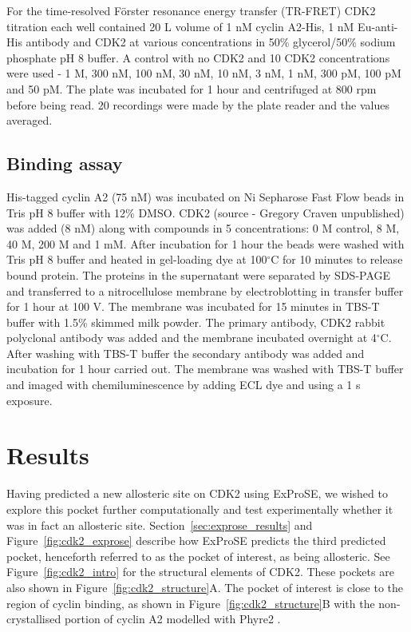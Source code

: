 For the time-resolved F\"{o}rster resonance energy transfer (TR-FRET) CDK2 titration each well contained 20 \textmu L volume of 1 nM cyclin A2-His, 1 nM Eu-anti-His antibody and CDK2 at various concentrations in 50\% glycerol/50\% sodium phosphate pH 8 buffer.
A control with no CDK2 and 10 CDK2 concentrations were used - 1 \textmu M, 300 nM, 100 nM, 30 nM, 10 nM, 3 nM, 1 nM, 300 pM, 100 pM and 50 pM.
The plate was incubated for 1 hour and centrifuged at 800 rpm before being read.
20 recordings were made by the plate reader and the values averaged.


\subsection{Binding assay}

His-tagged cyclin A2 (75 nM) was incubated on Ni Sepharose Fast Flow beads in Tris pH 8 buffer with 12\% DMSO.
CDK2 (source - Gregory Craven unpublished) was added (8 nM) along with compounds in 5 concentrations: 0 M control, 8 \textmu M, 40 \textmu M, 200 \textmu M and 1 mM.
After incubation for 1 hour the beads were washed with Tris pH 8 buffer and heated in gel-loading dye at 100$^{\circ}$C for 10 minutes to release bound protein.
The proteins in the supernatant were separated by SDS-PAGE and transferred to a nitrocellulose membrane by electroblotting in transfer buffer for 1 hour at 100 V.
The membrane was incubated for 15 minutes in TBS-T buffer with 1.5\% skimmed milk powder.
The primary antibody, CDK2 rabbit polyclonal antibody was added and the membrane incubated overnight at 4$^{\circ}$C.
After washing with TBS-T buffer the secondary antibody was added and incubation for 1 hour carried out.
The membrane was washed with TBS-T buffer and imaged with chemiluminescence by adding ECL dye and using a 1 s exposure.


\section{Results}
\label{sec:cdk2_results}

Having predicted a new allosteric site on CDK2 using ExProSE, we wished to explore this pocket further computationally and test experimentally whether it was in fact an allosteric site.
Section~\ref{sec:exprose_results} and Figure~\ref{fig:cdk2_exprose} describe how ExProSE predicts the third predicted pocket, henceforth referred to as the pocket of interest, as being allosteric.
See Figure~\ref{fig:cdk2_intro} for the structural elements of CDK2.
These pockets are also shown in Figure~\ref{fig:cdk2_structure}A.
The pocket of interest is close to the region of cyclin binding, as shown in Figure~\ref{fig:cdk2_structure}B with the non-crystallised portion of cyclin A2 modelled with Phyre2 \cite{Kelley2015}.

